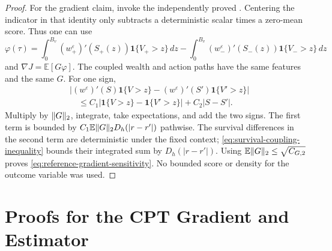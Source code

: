 \documentclass[11pt]{article}
\newcommand{\E}{\mathbb E}
\newcommand{\1}{\mathbf 1}
\DeclarePairedDelimiter{\norm}{\lVert}{\rVert}
\newcommand{\eps}{\varepsilon}
\begin{document}
\begin{proof}
For the gradient claim, invoke the independently proved . Centering the indicator in that identity only subtracts a deterministic scalar times a zero-mean score. Thus one can use
\[
 \varphi(\tau)=\int_0^{B_v}(w_+^\eps)'(S_+(z))\1\{V_+>z\}\,dz
 -\int_0^{B_v}(w_-^\eps)'(S_-(z))\1\{V_->z\}\,dz
\]
and $\nabla J=\E[G\varphi]$. The coupled wealth and action paths have the same features and the same $G$. For one sign,
\begin{align*}
 &|(w^\eps)'(S)\1\{V>z\}-(w^\eps)'(S')\1\{V'>z\}|\\
 &\hspace{1em}\le C_1|\1\{V>z\}-\1\{V'>z\}|+C_2|S-S'|.
\end{align*}
Multiply by $\norm{G}_2$, integrate, take expectations, and add the two signs. The first term is bounded by $C_1\E\norm{G}_2 D_h(|r-r'|)$ pathwise. The survival differences in the second term are deterministic under the fixed context; \eqref{eq:survival-coupling-inequality} bounds their integrated sum by $D_h(|r-r'|)$. Using $\E\norm{G}_2\le\sqrt{C_{G,2}}$ proves \eqref{eq:reference-gradient-sensitivity}. No bounded score or density for the outcome variable was used.
\end{proof}

\section{Proofs for the CPT Gradient and Estimator}\label{app:estimator-proofs}
\end{document}
